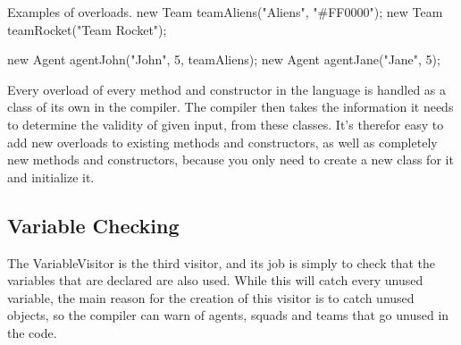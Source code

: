 \begin{source}{Examples of overloads.}{}
	new Team teamAliens("Aliens", "#FF0000");
	new Team teamRocket("Team Rocket");
	
	new Agent agentJohn("John", 5, teamAliens);
	new Agent agentJane("Jane", 5);
\end{source}

Every overload of every method and constructor in the language is handled as a class of its own in the compiler. 
The compiler then takes the information it needs to determine the validity of given input, from these classes. 
It's therefor easy to add new overloads to existing methods and constructors, as well as completely new methods and constructors, because you only need to create a new class for it and initialize it.

\subsection{Variable Checking}
The VariableVisitor is the third visitor, and its job is simply to check that the variables that are declared are also used. 
While this will catch every unused variable, the main reason for the creation of this visitor is to catch unused objects, so the compiler can warn of agents, squads and teams that go unused in the code.